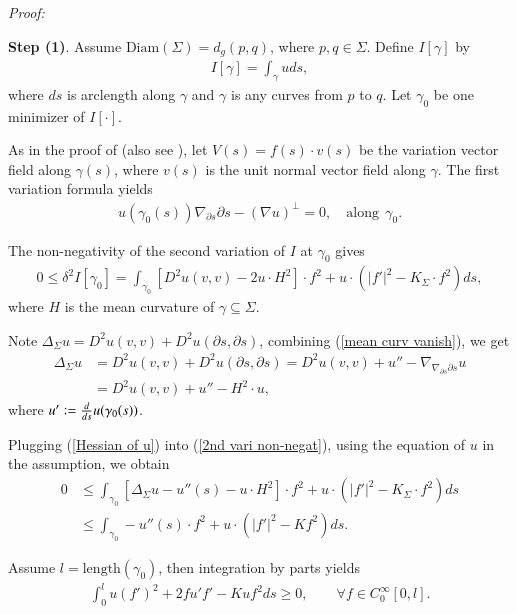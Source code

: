 \documentclass[11pt]{amsart}
\numberwithin{equation}{section}
\def\pf{{\it Proof:}~}
\begin{document}
\pf
{\textbf{Step (1)}. Assume $\mathrm{Diam}(\Sigma)= d_g(p, q)$, where $p, q\in \Sigma$. Define $I[\gamma]$ by 
\begin{align}
I[\gamma]= \int_\gamma u ds, \nonumber 
\end{align}
where $ds$ is arclength along $\gamma$ and $\gamma$ is any curves from $p$ to $q$. Let $\gamma_0$ be one minimizer of $I[\cdot]$. 

As in the proof of \cite[Proposition $1$]{SY-CMP} (also see \cite[Proposition $2.2$]{LZ}), let $V(s)= f(s)\cdot v(s)$ be the variation vector field along $\gamma(s)$, where $v(s)$ is the unit normal vector field along $\gamma$. The first variation formula yields
\begin{align}
 u(\gamma_0(s))\nabla_{\partial s}\partial s- (\nabla u)^\perp= 0, \quad \text{along}\ \ \gamma_0.\label{mean curv vanish}
\end{align}

The non-negativity of the  second variation of $I$ at $\gamma_0$ gives
\begin{align}
0\leq \delta^2I[\gamma_0]= \int_{\gamma_0} [D^2u(v, v)- 2u\cdot H^2]\cdot f^2+ u\cdot (|f'|^2- K_\Sigma\cdot f^2)ds, \label{2nd vari non-negat}
\end{align}
where $H$ is the mean curvature of $\gamma\subseteq \Sigma$.  

Note $\displaystyle \Delta_\Sigma u= D^2u(v, v)+ D^2u(\partial s, \partial s)$, combining (\ref{mean curv vanish}), we get
\begin{align}
\Delta_\Sigma u&= D^2u(v, v)+ D^2u(\partial s, \partial s)= D^2u(v, v)+ u''- \nabla_{\nabla_{\partial s}\partial s}u \nonumber \\
&= D^2u(v, v)+ u''- H^2\cdot u, \label{Hessian of u}
\end{align}
where  $u'\vcentcolon= \frac{d}{d s}u(\gamma_0(s))$.

Plugging (\ref{Hessian of u}) into (\ref{2nd vari non-negat}), using the equation of $u$ in the assumption, we obtain
\begin{align}
0&\leq \int_{\gamma_0} [\Delta_\Sigma u- u''(s)- u\cdot H^2]\cdot f^2+ u\cdot (|f'|^2- K_\Sigma\cdot f^2)ds\nonumber \\
&\leq \int_{\gamma_0} - u''(s)\cdot f^2+ u\cdot (|f'|^2- K f^2)ds. \nonumber 
\end{align}

Assume $l= \mathrm{length}(\gamma_0)$,  then integration by parts yields
\begin{align}
\int_0^l u(f')^2+ 2fu'f'- Kuf^2 ds\geq 0, \quad \quad \forall f\in C_0^\infty[0, l]. \label{integ ineq-main}
\end{align}

}
\end{document}
